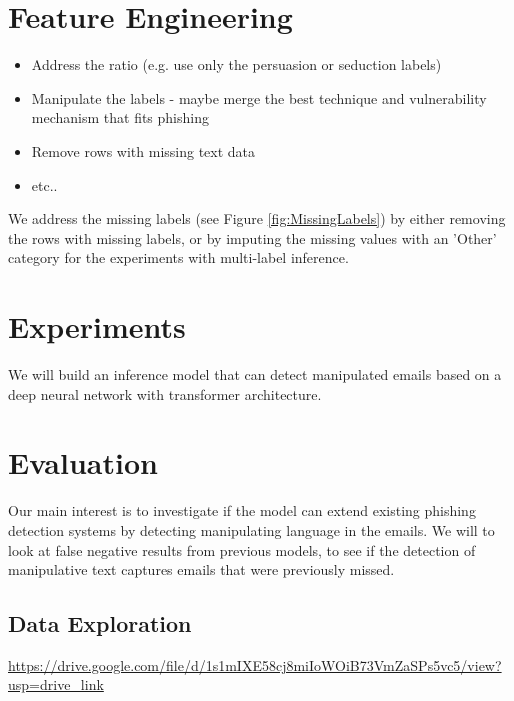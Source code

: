 \documentclass[
	letterpaper, %
	12pt, %
	unnumberedsections, %
	twoside, %
]{LTJournalArticle}
\begin{document}
\section{Feature Engineering}\label{sec:FeatureEngineering}


\begin{itemize}
	\item Address the ratio (e.g. use only the persuasion or seduction labels)
	\item Manipulate the labels - maybe merge the best technique and vulnerability mechanism that fits phishing
	\item Remove rows with missing text data
	\item etc..
\end{itemize}

We address the missing labels (see Figure \ref{fig:MissingLabels}) by either removing the rows with missing labels, or by imputing the missing values with an 'Other' category for the experiments with multi-label inference.




\section{Experiments}
We will build an inference model that can detect manipulated emails based on a deep neural network with transformer architecture.

\section{Evaluation}
Our main interest is to investigate if the model can extend existing phishing detection systems by detecting manipulating language in the emails. We will to look at false negative results from previous models, to see if the detection of manipulative text captures emails that were previously missed.








\clearpage
\onecolumn
\printbibliography %



\begin{appendices}
	\onecolumn
	\section{Data Exploration}\label{appendix:DataExploration}
	\url{https://drive.google.com/file/d/1s1mIXE58cj8miIoWOiB73VmZaSPs5vc5/view?usp=drive_link}
\end{appendices}
%
\end{document}
